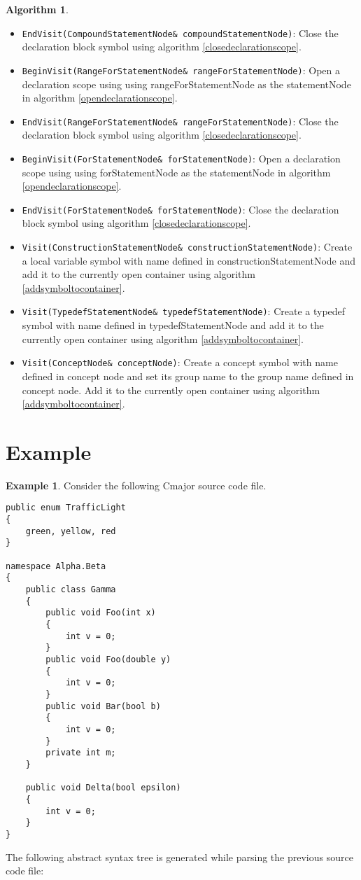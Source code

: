 \documentclass[a4paper,oneside,11pt]{book}
\theoremstyle{definition}
\newtheorem{exmp}{Example}[section]
\newtheorem{algo}{Algorithm}[section]
\begin{document}
\begin{algo}
\begin{itemize}
Open a declaration scope using using compoundStatementNode as the statementNode in algorithm \ref{opendeclarationscope}.
\item
\verb|EndVisit(CompoundStatementNode& compoundStatementNode)|:
Close the declaration block symbol using algorithm \ref{closedeclarationscope}.
\item
\verb|BeginVisit(RangeForStatementNode& rangeForStatementNode)|:
Open a declaration scope using using rangeForStatementNode as the statementNode in algorithm \ref{opendeclarationscope}.
\item
\verb|EndVisit(RangeForStatementNode& rangeForStatementNode)|:
Close the declaration block symbol using algorithm \ref{closedeclarationscope}.
\item
\verb|BeginVisit(ForStatementNode& forStatementNode)|:
Open a declaration scope using using forStatementNode as the statementNode in algorithm \ref{opendeclarationscope}.
\item
\verb|EndVisit(ForStatementNode& forStatementNode)|:
Close the declaration block symbol using algorithm \ref{closedeclarationscope}.
\item
\verb|Visit(ConstructionStatementNode& constructionStatementNode)|:
Create a local variable symbol with name defined in constructionStatementNode and
add it to the currently open container using algorithm \ref{addsymboltocontainer}.
\item
\verb|Visit(TypedefStatementNode& typedefStatementNode)|:
Create a typedef symbol with name defined in typedefStatementNode and
add it to the currently open container using algorithm \ref{addsymboltocontainer}.
\item
\verb|Visit(ConceptNode& conceptNode)|:
Create a concept symbol with name defined in concept node and
set its group name to the group name defined in concept node.
Add it to the currently open container using algorithm \ref{addsymboltocontainer}.
\end{itemize}
\end{algo}

\section{Example}

\begin{exmp}
Consider the following Cmajor source code file.

\begin{lstlisting}[language=Cmajor,frame=trBL]
public enum TrafficLight
{
    green, yellow, red
}

namespace Alpha.Beta
{
    public class Gamma
    {
        public void Foo(int x)
        {
            int v = 0;
        }
        public void Foo(double y)
        {
            int v = 0;
        }
        public void Bar(bool b)
        {
            int v = 0;
        }
        private int m;
    }

    public void Delta(bool epsilon)
    {
        int v = 0;
    }
}
\end{lstlisting}

\end{exmp}
\clearpage
The following abstract syntax tree is generated while parsing the previous source code file:
\end{document}
